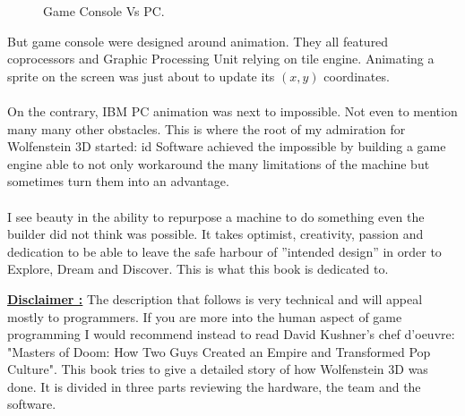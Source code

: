 \begin{figure}[H]
\centering
   \caption{Game Console Vs PC.} \label{fig:game_console_vs_PC}
 \end{figure}
 
But game console were designed around animation. They all featured coprocessors and Graphic Processing Unit relying on tile engine. Animating a sprite on the screen was just about to update its $(x,y)$ coordinates.\\
\\
On the contrary, IBM PC animation was next to impossible. Not even to mention many many other obstacles. This is where the root of my admiration for Wolfenstein 3D started: id Software achieved the impossible by building a game engine able to not only workaround the many limitations of the machine but sometimes turn them into an advantage.\\
\\
I see beauty in the ability to repurpose a machine to do something even the builder did not think was possible. It takes optimist, creativity, passion and dedication to be able to leave the safe harbour of ''intended design'' in order to Explore, Dream and Discover. This is what this book is dedicated to.\\
\bigskip

 \textbf{\underline{Disclaimer :}} The description that follows is very technical and will appeal mostly to programmers. If you are more into the human aspect of game programming I would recommend instead to read David Kushner's chef d'oeuvre: "Masters of Doom: How Two Guys Created an Empire and Transformed Pop Culture".
This book tries to give a detailed story of how Wolfenstein 3D was done. It is divided in three parts reviewing the hardware, the team and the software.